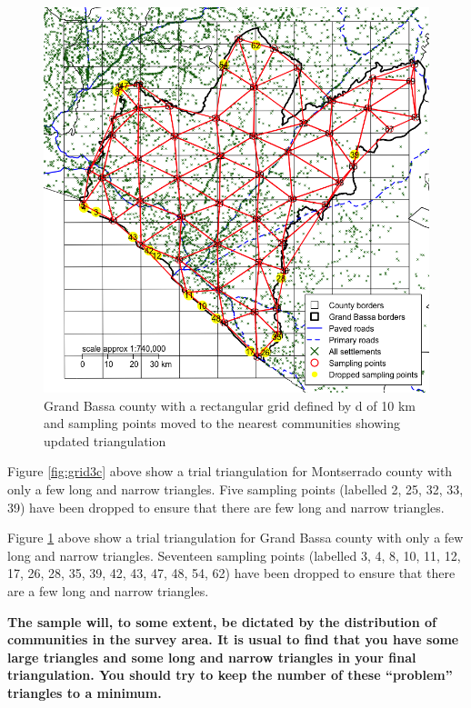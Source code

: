 \documentclass[12pt,a4paper]{book}
\theoremstyle{definition}
\theoremstyle{definition}
\theoremstyle{definition}
\theoremstyle{remark}
\begin{document}
\begin{figure}[H]

{\centering \includegraphics{figures/grid4c-1} 

}

\caption{Grand Bassa county with a rectangular grid defined by d of 10 km and sampling points moved to the nearest communities showing updated triangulation}\label{fig:grid4c}
\end{figure}

Figure \ref{fig:grid3c} above show a trial triangulation for Montserrado
county with only a few long and narrow triangles. Five sampling points
(labelled 2, 25, 32, 33, 39) have been dropped to ensure that there are
few long and narrow triangles.

Figure \ref{fig:grid4c} above show a trial triangulation for Grand Bassa
county with only a few long and narrow triangles. Seventeen sampling
points (labelled 3, 4, 8, 10, 11, 12, 17, 26, 28, 35, 39, 42, 43, 47,
48, 54, 62) have been dropped to ensure that there are a few long and
narrow triangles.

\newpage

\textbf{The sample will, to some extent, be dictated by the distribution
of communities in the survey area. It is usual to find that you have
some large triangles and some long and narrow triangles in your final
triangulation. You should try to keep the number of these ``problem''
triangles to a minimum.}
\end{document}
